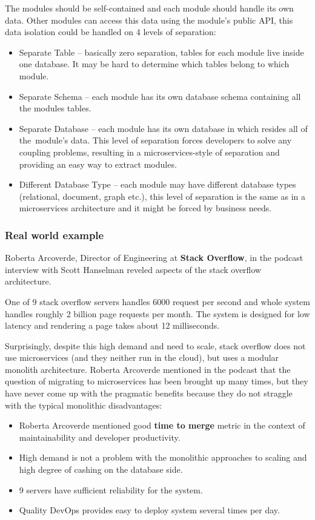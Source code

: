 The modules should be self-contained and each module should handle its own data. Other modules can access this data using the module's public API, this data isolation could be handled on 4 levels of separation:
\begin{itemize}
    \item Separate Table -- basically zero separation, tables for each module live inside one database. It may be hard to determine which tables belong to which module.
    \item Separate Schema -- each module has its own database schema containing all the modules tables.
    \item Separate Database -- each module has its own database in which resides all of the~module's data. This level of separation forces developers to solve any coupling problems, resulting in a microservices-style of separation and providing an easy way to extract modules.
    \item Different Database Type -- each module may have different database types (relational, document, graph etc.), this level of separation is the same as in a microservices architecture and it might be forced by business needs.
\end{itemize}

\subsubsection{Real world example}
Roberta Arcoverde, Director of Engineering at \textbf{Stack Overflow}, in the podcast interview with Scott Hanselman \cite{roberta_arcoverde:stackoverflow_mm} reveled aspects of the stack overflow architecture. 

One of 9 stack overflow servers handles 6000 request per second and whole system handles roughly 2 billion page requests per month. The system is designed for low latency and rendering a page takes about 12 milliseconds.

Surprisingly, despite this high demand and need to scale, stack overflow does not use microservices  (and they neither run in the cloud), but uses a modular monolith architecture. Roberta Arcoverde mentioned in the podcast that the question of migrating to microservices has been brought up many times, but they have never come up with the pragmatic benefits because they do not straggle with the typical monolithic disadvantages:
\begin{itemize}
    \item Roberta Arcoverde mentioned good \textbf{time to merge} metric in the context of maintainability and developer productivity.
    \item High demand is not a problem with the monolithic approaches to scaling and high degree of cashing on the database side.
    \item 9 servers have sufficient reliability for the system.
    \item Quality DevOps provides easy to deploy system several times per day.
\end{itemize}

